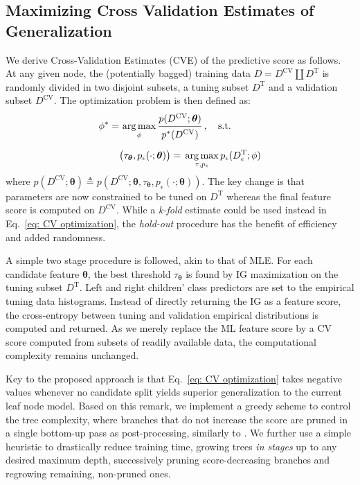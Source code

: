 \subsection{Maximizing Cross Validation Estimates of Generalization}   
\label{sec: CVE}

We derive Cross-Validation Estimates (CVE) of the predictive score as follows. At any given node, the (potentially bagged) training data $D=D^{\text{CV}}\!\coprod\! D^{\text{T}}$ is randomly divided in two disjoint subsets, a tuning subset $D^{\text{T}}$ and a validation subset $D^{\text{CV}}$. The optimization problem is then defined as:
\begin{equation}
\begin{split}
\phi^\ast = & \,\argmax_{\phi} \cfrac{p(D^{\text{CV}};\bm{\theta})}{\raisebox{-0.5ex}{$p^\ast(D^{\text{CV}})$}} \; , \quad \text{s.t. }\\[\medskipamount]
& \big(\tau_{\bm{\theta}}, p_\epsilon(\cdot;\bm{\theta})\big) = \,\argmax_{\tau, p_\epsilon} p_\epsilon(D_\epsilon^{\text{T}};\phi)
\end{split}
\label{eq: CV optimization}
\end{equation}
where $p(D^{\text{CV}};\bm{\theta})\!\triangleq\! p(D^{\text{CV}};\bm{\theta}, \tau_{\bm{\theta}}, p_\epsilon(\cdot;\bm{\theta}))$. The key change is that parameters are now constrained to be tuned on $D^{\text{T}}$ whereas the final feature score is computed on $D^{\text{CV}}$. While a \textit{k-fold} estimate could be used instead in Eq.~\eqref{eq: CV optimization}, the \textit{hold-out} procedure has the benefit of efficiency and added randomness. 

A simple two stage procedure is followed, akin to that of MLE.%
For each candidate feature $\bm{\theta}$, the best threshold $\tau_{\bm{\theta}}$ is found by IG maximization on the tuning subset $D^{\text{T}}$. Left and right children' class predictors are set to the empirical tuning data histograms. Instead of directly returning the IG as a feature score, the cross-entropy between tuning and validation empirical distributions is computed and returned. As we merely replace the ML feature score by a CV score computed from subsets of readily available data, the computational complexity remains unchanged.

Key to the proposed approach is that Eq.~\eqref{eq: CV optimization} takes negative values whenever no candidate split yields superior generalization to the current leaf node model. Based on this remark, we implement a greedy scheme to control the tree complexity, where branches that do not increase the score are pruned in a single bottom-up pass as post-processing, similarly to \cite{quinlan1987simplifying}. We further use a simple heuristic to drastically reduce training time, growing trees \textit{in stages} up to any desired maximum depth, successively pruning score-decreasing branches and regrowing remaining, non-pruned ones.
